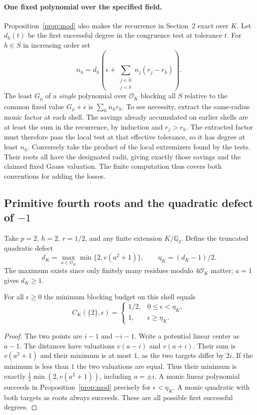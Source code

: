 \paragraph{One fixed polynomial over the specified field.}
Proposition~\ref{prop:mod} also makes the recurrence in Section~2 exact over $K$. Let $d_h(t)$ be the first successful degree in the congruence test at tolerance $t$. For $h\in S$ in increasing order set
\[
 n_h=d_h\!\left(\epsilon+\sum_{\substack{j\in S\\j<h}}
                         n_j(r_j-r_h)\right).
\]
The least $G_\rho$ of a \emph{single} polynomial over $\mathcal O_K$ blocking all $S$ relative to the common fixed value $G_\rho+\epsilon$ is $\sum_h n_hr_h$. To see necessity, extract the same-radius monic factor at each shell. The savings already accumulated on earlier shells are at least the sum in the recurrence, by induction and $r_j>r_h$. The extracted factor must therefore pass the local test at that effective tolerance, so it has degree at least $n_h$. Conversely take the product of the local extremizers found by the tests. Their roots all have the designated radii, giving exactly those savings and the claimed fixed Gauss valuation. The finite computation thus covers both conventions for adding the losses.

\subsection{Primitive fourth roots and the quadratic defect of \texorpdfstring{$-1$}{-1}}
\label{sec:dyadic}
Take $p=2$, $h=2$, $r=1/2$, and any finite extension $K/\mathbb Q_2$. Define the truncated quadratic defect
\[
             d_K=\max_{a\in\mathcal O_K}\min\{2,v(a^2+1)\},
             \qquad \eta_K=(d_K-1)/2 .
\]
The maximum exists since only finitely many residues modulo $4\mathcal O_K$ matter; $a=1$ gives $d_K\ge1$.

\begin{theorem}\label{th:fourth}
For all $\epsilon\ge0$ the minimum blocking budget on this shell equals
\[
 C_K(\{2\},\epsilon)=
 \begin{cases}
   1/2,&0\le\epsilon<\eta_K,\\
   1,&\epsilon\ge\eta_K.
 \end{cases}
\]
\end{theorem}
\begin{proof}
The two points are $i-1$ and $-i-1$. Write a potential linear center as $a-1$. The distances have valuations $v(a-i)$ and $v(a+i)$. Their sum is $v(a^2+1)$ and their minimum is at most $1$, as the two targets differ by $2i$. If the minimum is less than $1$ the two valuations are equal. Thus their minimum is exactly $\tfrac12\min(2,v(a^2+1))$, including $a=\pm i$. A monic linear polynomial succeeds in Proposition~\ref{prop:mod} precisely for $\epsilon<\eta_K$. A monic quadratic with both targets as roots always succeeds. These are all possible first successful degrees.
\end{proof}

